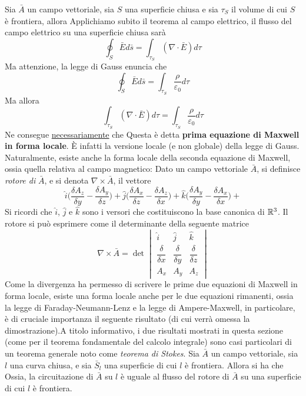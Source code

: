 \documentclass[10pt, letterpaper]{report}
\begin{document}
 Sia $\bar A$ un campo vettoriale, sia $S$ una superficie chiusa e sia $\tau_S$ il volume di cui $S$ è frontiera, allora
Applichiamo subito il teorema al campo elettrico, il flusso del campo elettrico su una superficie chiusa sarà 
$$\oint_S \bar E d\bar s =\int_{\tau_S}(\nabla \cdot \bar E)d\tau $$
Ma attenzione, la legge di Gauss enuncia che 
$$\oint_S \bar E d\bar s =\int_{\tau_S}\frac{\rho}{\varepsilon_0}d\tau $$
Ma allora 
$$\int_{\tau_S}(\nabla \cdot \bar E)d\tau=\int_{\tau_S}\frac{\rho}{\varepsilon_0}d\tau $$
Ne consegue \underline{necessariamente} che 
Questa è detta \textbf{prima equazione di Maxwell in forma locale}. È infatti la versione locale (e non globale) della legge di Gauss. Naturalmente, esiste anche la forma locale della seconda equazione di Maxwell, ossia quella relativa al campo magnetico:
 Dato un campo vettoriale $\bar A$, si definisce \textit{rotore di } $\bar A$, e si denota $\nabla \times \bar A $, il vettore 
$$\hat i\Big(\frac{\delta A_z}{\delta y}-\frac{\delta A_y}{\delta z}\Big)+
\hat j\Big(\frac{\delta A_x}{\delta z}-\frac{\delta A_z}{\delta x}\Big)+
\hat k\Big(\frac{\delta A_y}{\delta y}-\frac{\delta A_x}{\delta x}\Big)+ $$
Si ricordi che $\hat i$, $\hat j$ e $\hat k$ sono i versori che costituiscono la base canonica di ${\mathbb R}^3$. Il rotore si può esprimere come il determinante della seguente matrice 
$$\nabla \times \bar A=\det\begin{vmatrix}
    \hat i & \hat j & \hat k \\ 
    \dfrac{\delta}{\delta x} &  \dfrac{\delta}{\delta y} &  \dfrac{\delta}{\delta z} \\ 
    A_x & A_y & A_z
\end{vmatrix} $$
Come la divergenza ha permesso di scrivere le prime due equazioni di Maxwell in forma locale, esiste una forma locale anche per le due equazioni rimanenti, ossia la legge di Faraday-Neumann-Lenz e la legge di Ampere-Maxwell, in particolare, è di cruciale importanza il seguente risultato (di cui verrà omessa la dimostrazione).\acc  A titolo informativo, i due risultati mostrati in questa sezione (come per il teorema fondamentale del calcolo integrale) sono casi particolari di un teorema generale noto come \textit{teorema di Stokes}.\acc
{} Sia $\bar A$ un campo vettoriale, sia $l$ una curva chiusa, e sia $\bar S_l$ una superficie di cui $l$ è frontiera. Allora si ha che 
Ossia, la circuitazione di $\bar A$ su $l$ è uguale al flusso del rotore di $\bar A$ su una superficie di cui $l$ è frontiera. 
\end{document}

